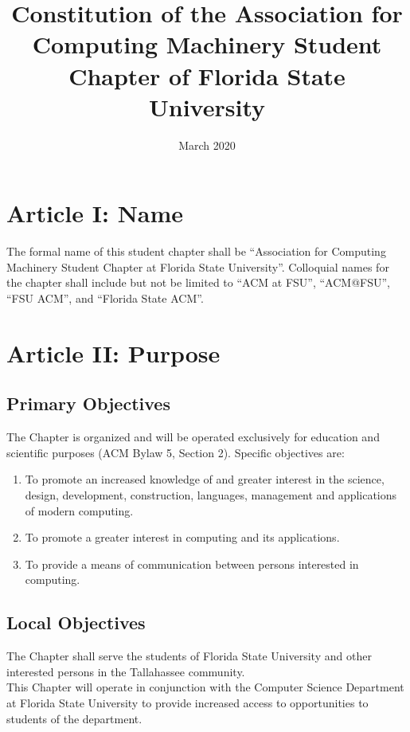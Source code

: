 \documentclass{article}
\title{Constitution of the Association for Computing
Machinery Student Chapter of Florida State
University}
\date{March 2020}
\begin{document}
\maketitle
\newpage
\tableofcontents
\newpage


\section{Article I: Name}

The formal name of this student chapter shall be ``Association for
Computing Machinery Student Chapter at Florida State University''.
Colloquial names for the chapter shall include but not be limited to
``ACM at FSU'', ``ACM@FSU'', ``FSU ACM'', and ``Florida State ACM''.

\section{Article II: Purpose}

\subsection{Primary Objectives}

The Chapter is organized and will be operated exclusively for education and scientific purposes (ACM Bylaw 5, Section 2). Specific objectives are:

\begin{enumerate}
\item
  To promote an increased knowledge of and greater interest in the
  science, design, development, construction, languages, management and applications of modern computing.
\item
  To promote a greater interest in computing and its applications.
\item
  To provide a means of communication between persons interested in
  computing.
\end{enumerate}

\subsection{Local Objectives}

The Chapter shall serve the students of Florida State University and other interested persons in the Tallahassee community.\\

This Chapter will operate in conjunction with the Computer Science Department at Florida State University to provide increased access to opportunities to students of the department.
\end{document}
